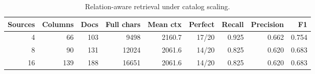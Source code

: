 \begin{table}[htbp]
\centering
\caption{Relation-aware retrieval under catalog scaling.}
\label{tab:catalog-scaling}
\begin{tabular}{rrrrrrrrr}
\toprule
Sources & Columns & Docs & Full chars & Mean ctx & Perfect & Recall & Precision & F1 \\
\midrule
4 & 66 & 103 & 9498 & 2160.7 & 17/20 & 0.925 & 0.662 & 0.754 \\
8 & 90 & 131 & 12024 & 2061.6 & 14/20 & 0.825 & 0.620 & 0.683 \\
16 & 139 & 188 & 16651 & 2061.6 & 14/20 & 0.825 & 0.620 & 0.683 \\
\bottomrule
\end{tabular}
\end{table}
